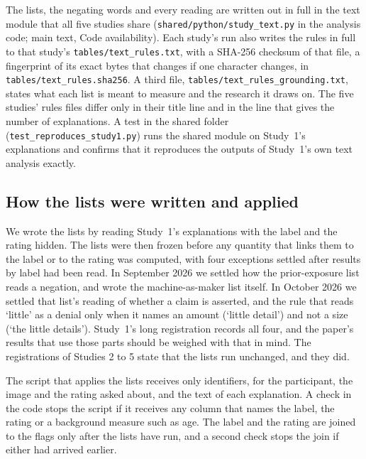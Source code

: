 The lists, the negating words and every reading are written out in full in the text module that all five studies share (\nolinkurl{shared/python/study_text.py} in the analysis code; main text, Code availability). Each study's run also writes the rules in full to that study's \nolinkurl{tables/text_rules.txt}, with a SHA-256 checksum of that file, a fingerprint of its exact bytes that changes if one character changes, in \nolinkurl{tables/text_rules.sha256}. A third file, \nolinkurl{tables/text_rules_grounding.txt}, states what each list is meant to measure and the research it draws on. The five studies' rules files differ only in their title line and in the line that gives the number of explanations. A test in the shared folder (\nolinkurl{test_reproduces_study1.py}) runs the shared module on Study~1's explanations and confirms that it reproduces the outputs of Study~1's own text analysis exactly.

\subsection*{How the lists were written and applied}

We wrote the lists by reading Study~1's explanations with the label and the rating hidden. The lists were then frozen before any quantity that links them to the label or to the rating was computed, with four exceptions settled after results by label had been read. In September 2026 we settled how the prior-exposure list reads a negation, and wrote the machine-as-maker list itself. In October 2026 we settled that list's reading of whether a claim is asserted, and the rule that reads `little' as a denial only when it names an amount (`little detail') and not a size (`the little details'). Study~1's long registration records all four, and the paper's results that use those parts should be weighed with that in mind. The registrations of Studies 2 to 5 state that the lists run unchanged, and they did.

The script that applies the lists receives only identifiers, for the participant, the image and the rating asked about, and the text of each explanation. A check in the code stops the script if it receives any column that names the label, the rating or a background measure such as age. The label and the rating are joined to the flags only after the lists have run, and a second check stops the join if either had arrived earlier.

